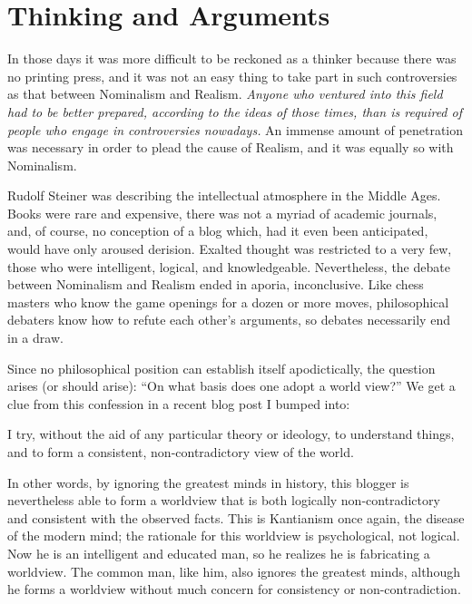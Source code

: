 \section{Thinking and Arguments}

\begin{quotex}
In those days it was more difficult to be reckoned as a thinker because there was no printing press, and it was not an easy thing to take part in such controversies as that between Nominalism and Realism. \emph{Anyone who ventured into this field had to be better prepared, according to the ideas of those times, than is required of people who engage in controversies nowadays.} An immense amount of penetration was necessary in order to plead the cause of Realism, and it was equally so with Nominalism.
\end{quotex}


Rudolf Steiner was describing the intellectual atmosphere in the Middle Ages. Books were rare and expensive, there was not a myriad of academic journals, and, of course, no conception of a blog which, had it even been anticipated, would have only aroused derision. Exalted thought was restricted to a very few, those who were intelligent, logical, and knowledgeable. Nevertheless, the debate between Nominalism and Realism ended in aporia, inconclusive. Like chess masters who know the game openings for a dozen or more moves, philosophical debaters know how to refute each other's arguments, so debates necessarily end in a draw.

Since no philosophical position can establish itself apodictically, the question arises (or should arise): ``On what basis does one adopt a world view?'' We get a clue from this confession in a recent blog post I bumped into:

\begin{quotex}
I try, without the aid of any particular theory or ideology, to understand things, and to form a consistent, non-contradictory view of the world.
\end{quotex}

In other words, by ignoring the greatest minds in history, this blogger is nevertheless able to form a worldview that is both logically non-contradictory and consistent with the observed facts. This is Kantianism once again, the disease of the modern mind; the rationale for this worldview is psychological, not logical. Now he is an intelligent and educated man, so he realizes he is fabricating a worldview. The common man, like him, also ignores the greatest minds, although he forms a worldview without much concern for consistency or non-contradiction.


